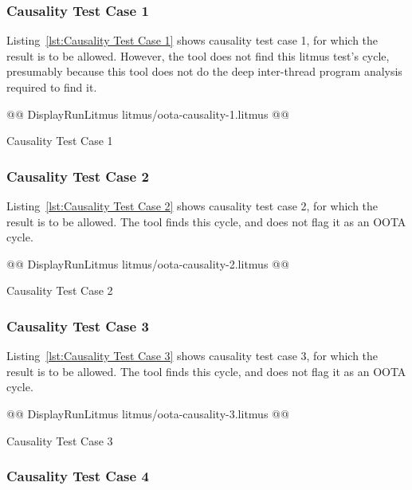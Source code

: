\documentclass[10]{article}
\begin{document}
\subsubsection{Causality Test Case 1}
\label{app:Causality Test Case 1}

Listing~\ref{lst:Causality Test Case 1}
shows causality test case 1, for which the  result
is to be allowed.
However, the  tool does not find this litmus test's cycle, presumably
because this tool does not do the deep inter-thread program analysis
required to find it.

\begin{listing}[tbp]
@@ DisplayRunLitmus litmus/oota-causality-1.litmus @@
\caption{Causality Test Case 1}
\label{lst:Causality Test Case 1}
\end{listing}

\subsubsection{Causality Test Case 2}
\label{app:Causality Test Case 2}

Listing~\ref{lst:Causality Test Case 2}
shows causality test case 2, for which the  result
is to be allowed.
The  tool finds this cycle, and does not flag it as an OOTA cycle.

\begin{listing}[tbp]
@@ DisplayRunLitmus litmus/oota-causality-2.litmus @@
\caption{Causality Test Case 2}
\label{lst:Causality Test Case 2}
\end{listing}

\subsubsection{Causality Test Case 3}
\label{app:Causality Test Case 3}

Listing~\ref{lst:Causality Test Case 3}
shows causality test case 3, for which the  result
is to be allowed.
The  tool finds this cycle, and does not flag it as an OOTA cycle.

\begin{listing}[tbp]
@@ DisplayRunLitmus litmus/oota-causality-3.litmus @@
\caption{Causality Test Case 3}
\label{lst:Causality Test Case 3}
\end{listing}

\subsubsection{Causality Test Case 4}
\label{app:Causality Test Case 4}
\end{document}
